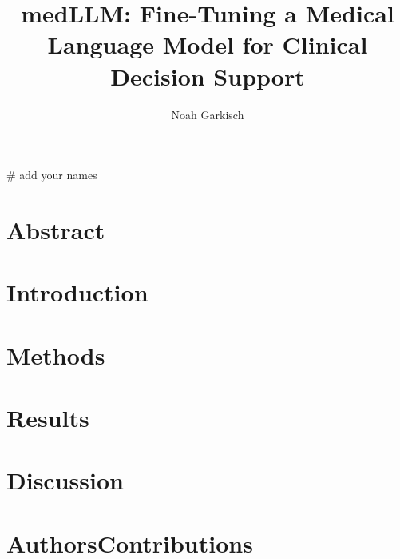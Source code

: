 \documentclass[a4paper,12pt]{article}
\begin{document}
\title{medLLM: Fine-Tuning a Medical Language Model for Clinical Decision Support}
# add your names
\author{Noah Garkisch}

\section{Abstract}


\section{Introduction}


\section{Methods}


\section{Results}


\section{Discussion}


\printbibliography

\section{AuthorsContributions}

\end{document}
